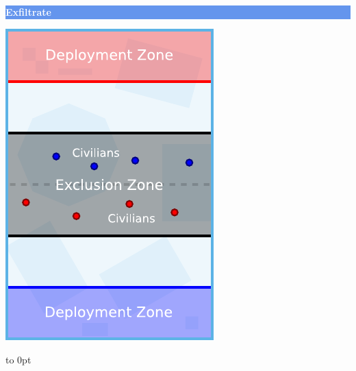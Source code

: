 \documentclass[14pt,dvipsnames]{extarticle}
\begin{document}
\hfill
\begin{minipage}{2in}\centering
\colorbox{CornflowerBlue}{\parbox[t][12pt]{\linewidth}{\centering\textcolor{White}{\textbf{Exfiltrate}}}}

\smallskip
\includegraphics[scale=0.9]{maps/map-exfiltrate}
\end{minipage}
\hfill
\hbox to 0pt{}
\end{document}
